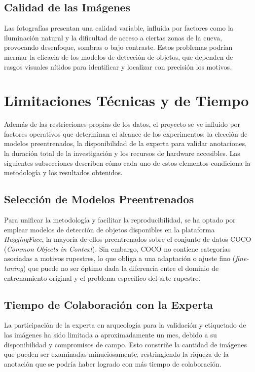 \subsection{Calidad de las Imágenes}

Las fotografías presentan una calidad variable, influida por factores como la iluminación natural y la dificultad de acceso a ciertas zonas de la cueva, provocando desenfoque, sombras o bajo contraste.
Estos problemas podrían mermar la eficacia de los modelos de detección de objetos, que dependen de rasgos visuales nítidos para identificar y localizar con precisión los motivos.

\section{Limitaciones Técnicas y de Tiempo}

Además de las restricciones propias de los datos, el proyecto se ve influido por factores operativos que determinan el alcance de los experimentos: la elección de modelos preentrenados, la disponibilidad de la experta para validar anotaciones, la duración total de la investigación y los recursos de hardware accesibles.
Las siguientes subsecciones describen cómo cada uno de estos elementos condiciona la metodología y los resultados obtenidos.

\subsection{Selección de Modelos Preentrenados}

Para unificar la metodología y facilitar la reproducibilidad, se ha optado por emplear modelos de detección de objetos disponibles en la plataforma \textit{HuggingFace}, la mayoría de ellos preentrenados sobre el conjunto de datos COCO (\textit{Common Objects in Context}).
Sin embargo, COCO no contiene categorías asociadas a motivos rupestres, lo que obliga a una adaptación o ajuste fino (\textit{fine-tuning}) que puede no ser óptimo dada la diferencia entre el dominio de entrenamiento original y el problema específico del arte rupestre.

\subsection{Tiempo de Colaboración con la Experta}

La participación de la experta en arqueología para la validación y etiquetado de las imágenes ha sido limitada a aproximadamente un mes, debido a su disponibilidad y compromisos de campo.
Esto constriñe la cantidad de imágenes que pueden ser examinadas minuciosamente, restringiendo la riqueza de la anotación que se podría haber logrado con más tiempo de colaboración.

